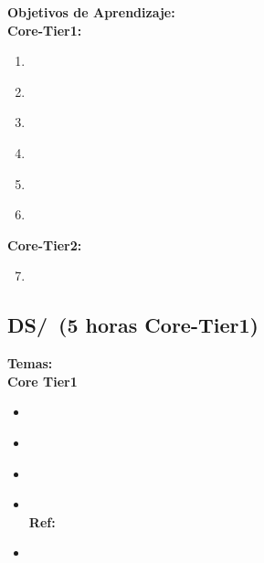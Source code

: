 \noindent \textbf{Objetivos de Aprendizaje:}\\
\noindent \textbf{Core-Tier1:}
\begin{enumerate}
	\setcounter{enumi}{0}
	\item \DSProofTechniquesLOIdentifyTheUsed\xspace[\DSProofTechniquesLOIdentifyTheUsedLevel]\label{sec:BOK:DSProofTechniquesLOIdentifyTheUsed}
	\item \DSProofTechniquesLOOutline\xspace[\DSProofTechniquesLOOutlineLevel]\label{sec:BOK:DSProofTechniquesLOOutline}
	\item \DSProofTechniquesLOApplyEach\xspace[\DSProofTechniquesLOApplyEachLevel]\label{sec:BOK:DSProofTechniquesLOApplyEach}
	\item \DSProofTechniquesLODetermineWhich\xspace[\DSProofTechniquesLODetermineWhichLevel]\label{sec:BOK:DSProofTechniquesLODetermineWhich}
	\item \DSProofTechniquesLOExplainTheIdeas\xspace[\DSProofTechniquesLOExplainTheIdeasLevel]\label{sec:BOK:DSProofTechniquesLOExplainTheIdeas}
	\item \DSProofTechniquesLOExplainTheWeak\xspace[\DSProofTechniquesLOExplainTheWeakLevel]\label{sec:BOK:DSProofTechniquesLOExplainTheWeak}
\end{enumerate}
\noindent \textbf{Core-Tier2:}
\begin{enumerate}
	\setcounter{enumi}{6}
	\item \DSProofTechniquesLOStateThe\xspace[\DSProofTechniquesLOStateTheLevel]\label{sec:BOK:DSProofTechniquesLOStateThe}
\end{enumerate}


\subsection{DS/\DSBasicsofCounting~(5 horas Core-Tier1)}\label{sec:BOK:DSBasicsofCounting}
\noindent \textbf{Temas:}\\
\noindent \textbf{Core Tier1}
\begin{itemize}
	\item \DSBasicsofCountingTopicCounting\label{sec:BOK:DSBasicsofCountingTopicCounting}
	\item \DSBasicsofCountingTopicThePigeonhole\label{sec:BOK:DSBasicsofCountingTopicThePigeonhole}
	\item \DSBasicsofCountingTopicPermutations\label{sec:BOK:DSBasicsofCountingTopicPermutations}
	\item \DSBasicsofCountingTopicSolving\xspace \\ \textbf{Ref:} \label{sec:BOK:DSBasicsofCountingTopicSolving}
	\item \DSBasicsofCountingTopicBasic\label{sec:BOK:DSBasicsofCountingTopicBasic}
\end{itemize}


